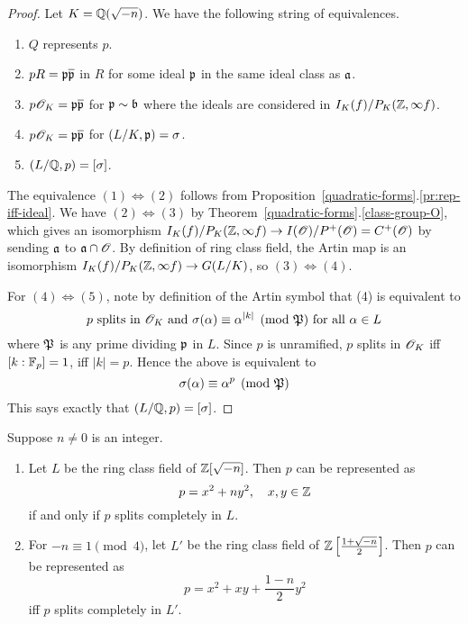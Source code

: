 \begin{proof}
Let $K=\mathbb{Q}(\sqrt{-n})$. 
We have the following string of equivalences.
\begin{enumerate}
\item
$Q$ represents $p$.
\item 
$pR=\mathfrak{p}\overline{\mathfrak{p}}$ in $R$ for some ideal $\mathfrak{p}$ in the same ideal class as $\mathfrak{a}$.
\item
$p\mathscr{O}_K=\mathfrak{p}\overline{\mathfrak{p}}$ for $\mathfrak{p}\sim \mathfrak{b}$ where the ideals are considered in $I_K(f)/P_K(\mathbb{Z},\infty f)$.
\item
$p\mathscr{O}_K=\mathfrak{p}\overline{\mathfrak{p}}$ for $(L/K,\mathfrak{p})=\sigma$.
\item
$(L/\mathbb{Q},p)=[\sigma]$.
\end{enumerate}
%
The equivalence $(1)\iff (2)$ follows from Proposition~\ref{quadratic-forms}.\ref{pr:rep-iff-ideal}. 
We have $(2)\iff (3)$ by Theorem~\ref{quadratic-forms}.\ref{class-group-O}, which gives an isomorphism $I_K(f)/P_K(\mathbb{Z},\infty f)\to I(\mathscr{O})/P^+(\mathscr{O})=C^+(\mathscr{O})$ by sending $\mathfrak{a}$ to $\mathfrak{a}\cap \mathscr{O}$. 
By definition of ring class field, the Artin map is an isomorphism $I_K(f)/P_{K}(\mathbb{Z},\infty f)\to G(L/K)$, so $(3)\iff (4)$.

For $(4)\iff (5)$, note by definition of the Artin symbol that (4) is equivalent to 
\[
p\text{ splits in $\mathscr{O}_K$ and }\sigma(\alpha)\equiv \alpha^{|k|}\pmod{\mathfrak{P}}
\text{ for all }\alpha\in L
\]
where $\mathfrak{P}$ is any prime dividing $\mathfrak{p}$ in $L$.
Since $p$ is unramified, $p$ splits in $\mathscr{O}_K$ iff $[k:\mathbb{F}_p]=1$, iff $|k|=p$. Hence the above is equivalent to
\[
\sigma(\alpha)\equiv \alpha^{p}\pmod{\mathfrak{P}}
\]
This says exactly that $(L/\mathbb{Q},p)=[\sigma]$.
\end{proof}
\begin{cor}Suppose $n\ne 0$ is an integer. 
\begin{enumerate}
\item
Let $L$ be the ring class field of $\mathbb{Z}[\sqrt{-n}]$. Then $p$ can be represented as
\[
p=x^2+ny^2,\quad x,y\in \mathbb{Z}
\]
if and only if $p$ splits completely in $L$.
\item
For $-n\equiv 1\pmod 4$, let $L'$ be the ring class field of $\mathbb{Z}\left[ {\frac{1+\sqrt{-n}}{2}} \right]$. Then $p$ can be represented as
\[
p=x^2+xy+\frac{1-n}{2}y^2
\]
iff $p$ splits completely in $L'$.
\end{enumerate}
\end{cor}
